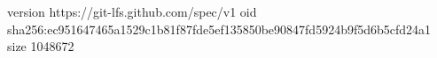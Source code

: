 version https://git-lfs.github.com/spec/v1
oid sha256:ec951647465a1529c1b81f87fde5ef135850be90847fd5924b9f5d6b5cfd24a1
size 1048672
